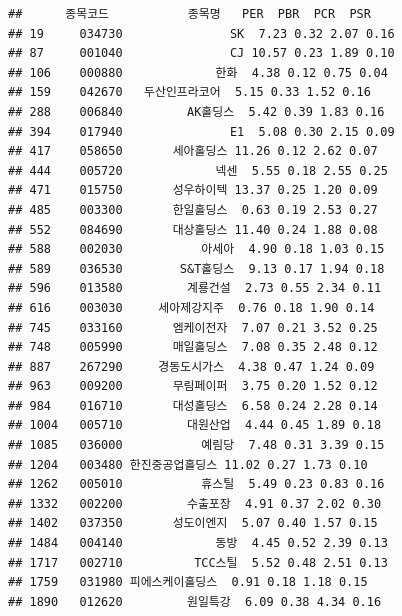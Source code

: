 \documentclass[12pt,]{book}
\newenvironment{Shaded}{\begin{snugshade}}{\end{snugshade}}
\newcommand{\DataTypeTok}[1]{\textcolor[rgb]{0.13,0.29,0.53}{#1}}
\newcommand{\DecValTok}[1]{\textcolor[rgb]{0.00,0.00,0.81}{#1}}
\newcommand{\KeywordTok}[1]{\textcolor[rgb]{0.13,0.29,0.53}{\textbf{#1}}}
\newcommand{\NormalTok}[1]{#1}
\newcommand{\OperatorTok}[1]{\textcolor[rgb]{0.81,0.36,0.00}{\textbf{#1}}}
\newcommand{\StringTok}[1]{\textcolor[rgb]{0.31,0.60,0.02}{#1}}
\begin{document}
\begin{Shaded}
\end{Shaded}

\begin{verbatim}
##      종목코드           종목명   PER  PBR  PCR  PSR
## 19     034730               SK  7.23 0.32 2.07 0.16
## 87     001040               CJ 10.57 0.23 1.89 0.10
## 106    000880             한화  4.38 0.12 0.75 0.04
## 159    042670   두산인프라코어  5.15 0.33 1.52 0.16
## 288    006840         AK홀딩스  5.42 0.39 1.83 0.16
## 394    017940               E1  5.08 0.30 2.15 0.09
## 417    058650       세아홀딩스 11.26 0.12 2.62 0.07
## 444    005720             넥센  5.55 0.18 2.55 0.25
## 471    015750       성우하이텍 13.37 0.25 1.20 0.09
## 485    003300       한일홀딩스  0.63 0.19 2.53 0.27
## 552    084690       대상홀딩스 11.40 0.24 1.88 0.08
## 588    002030           아세아  4.90 0.18 1.03 0.15
## 589    036530        S&T홀딩스  9.13 0.17 1.94 0.18
## 596    013580         계룡건설  2.73 0.55 2.34 0.11
## 616    003030     세아제강지주  0.76 0.18 1.90 0.14
## 745    033160       엠케이전자  7.07 0.21 3.52 0.25
## 748    005990       매일홀딩스  7.08 0.35 2.48 0.12
## 887    267290     경동도시가스  4.38 0.47 1.24 0.09
## 963    009200       무림페이퍼  3.75 0.20 1.52 0.12
## 984    016710       대성홀딩스  6.58 0.24 2.28 0.14
## 1004   005710         대원산업  4.44 0.45 1.89 0.18
## 1085   036000           예림당  7.48 0.31 3.39 0.15
## 1204   003480 한진중공업홀딩스 11.02 0.27 1.73 0.10
## 1262   005010           휴스틸  5.49 0.23 0.83 0.16
## 1332   002200         수출포장  4.91 0.37 2.02 0.30
## 1402   037350       성도이엔지  5.07 0.40 1.57 0.15
## 1484   004140             동방  4.45 0.52 2.39 0.13
## 1717   002710          TCC스틸  5.52 0.48 2.51 0.13
## 1759   031980 피에스케이홀딩스  0.91 0.18 1.18 0.15
## 1890   012620         원일특강  6.09 0.38 4.34 0.16
\end{verbatim}
\end{document}
